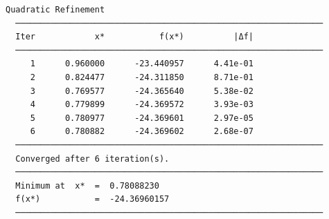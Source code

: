 \begin{verbatim}
Quadratic Refinement
  ──────────────────────────────────────────────────────────────
  Iter            x*           f(x*)          |Δf|
  ──────────────────────────────────────────────────────────────
     1      0.960000      -23.440957      4.41e-01
     2      0.824477      -24.311850      8.71e-01
     3      0.769577      -24.365640      5.38e-02
     4      0.779899      -24.369572      3.93e-03
     5      0.780977      -24.369601      2.97e-05
     6      0.780882      -24.369602      2.68e-07
  ──────────────────────────────────────────────────────────────
  Converged after 6 iteration(s).
  ──────────────────────────────────────────────────────────────
  Minimum at  x*  =  0.78088230
  f(x*)           =  -24.36960157
  ──────────────────────────────────────────────────────────────

\end{verbatim}
